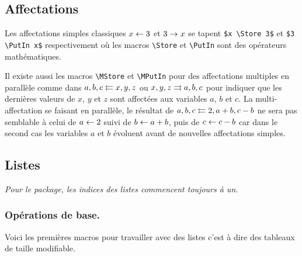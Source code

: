 \documentclass[12pt,a4paper]{article}
\theoremstyle{definition}
\newenvironment{frame-gene}[1][]{
	\begin{tcolorbox}[
		title        = #1, 
		colbacktitle = black!10!white, 
		colback      = white, 
		coltitle     = black,
		fonttitle    = \bfseries\itshape\small, 
		breakable,
		center title]
}{
	\end{tcolorbox}
}
\begin{document}

\subsection{Affectations}

Les affectations simples classiques $x \leftarrow 3$ et $3 \rightarrow x$ se tapent \verb+$x \Store 3$+ et \verb+$3 \PutIn x$+ respectivement où les macros \verb+\Store+ et \verb+\PutIn+ sont des opérateurs mathématiques.

\medskip

Il existe aussi les macros \verb+\MStore+ et \verb+\MPutIn+ pour des affectations multiples en parallèle comme dans $a, b, c \leftleftarrows x, y, z$ ou $x, y, z \rightrightarrows a, b, c$ pour indiquer que les dernières valeurs de $x$, $y$ et $z$ sont affectées aux variables $a$, $b$ et $c$.
La multi-affectation se faisant en parallèle, le résultat de $a, b, c \leftleftarrows 2, a + b, c - b$ ne sera pas semblable à celui de $a \leftarrow 2$ suivi de $b \leftarrow a + b$, puis de $c \leftarrow c - b$ car dans le second cas les variables $a$ et $b$ évoluent avant de nouvelles affectations simples.





\subsection{Listes}

\begin{frame-gene}
	\centering\itshape
	Pour le package, les indices des listes commencent toujours à un. 
\end{frame-gene}


\subsubsection{Opérations de base.}

Voici les premières macros pour travailler avec des listes c'est à dire des tableaux de taille modifiable.
\end{document}
